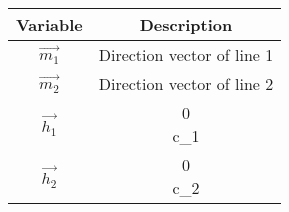 \begin{center}
    \begin{tabular}{|c|c|} 
        \hline
            \textbf{Variable} & \textbf{Description} \\ 
        \hline
	    $\vec{m_1}$ & Direction vector of line 1\\
        \hline
        $\vec{m_2}$ & Direction vector of line 2\\
        \hline
        $\vec{h_1}$ & \myvec{0\\c_1}\\  
        \hline
        $\vec{h_2}$ & \myvec{0\\c_2}\\
        \hline
    \end{tabular}
\end{center}

